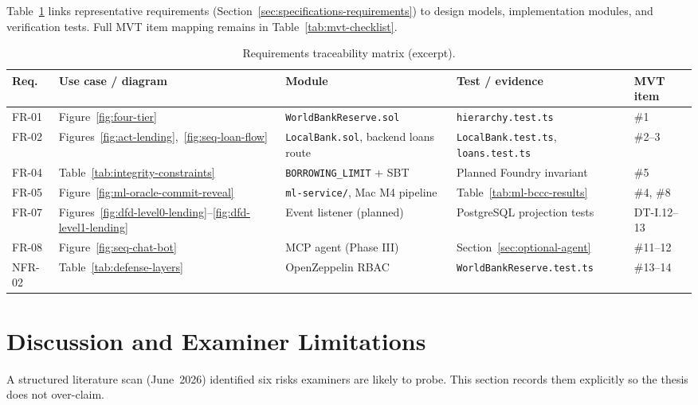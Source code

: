 \documentclass[12pt,a4paper]{report}
\newcommand{\tableheadcolor}{\rowcolor{TableHeadBg}}
\begin{document}
Table~\ref{tab:traceability} links representative requirements (Section~\ref{sec:specifications-requirements}) to design models, implementation modules, and verification tests. Full MVT item mapping remains in Table~\ref{tab:mvt-checklist}.

\begin{table}[H]
\centering
\caption[Requirements traceability matrix (excerpt)]{Requirements traceability matrix (excerpt).}
\label{tab:traceability}
\footnotesize
\begin{tabular}{@{}p{1.1cm}p{2.6cm}p{2.8cm}p{2.6cm}p{3.2cm}@{}}
\toprule
\tableheadcolor
\textbf{Req.} & \textbf{Use case / diagram} & \textbf{Module} & \textbf{Test / evidence} & \textbf{MVT item} \\
\midrule
FR-01 & Figure~\ref{fig:four-tier} & \texttt{WorldBankReserve.sol} & \texttt{hierarchy.test.ts} & \#1 \\
FR-02 & Figures~\ref{fig:act-lending},~\ref{fig:seq-loan-flow} & \texttt{LocalBank.sol}, backend loans route & \texttt{LocalBank.test.ts}, \texttt{loans.test.ts} & \#2--3 \\
FR-04 & Table~\ref{tab:integrity-constraints} & \texttt{BORROWING\_LIMIT} + SBT & Planned Foundry invariant & \#5 \\
FR-05 & Figure~\ref{fig:ml-oracle-commit-reveal} & \texttt{ml-service/}, Mac M4 pipeline & Table~\ref{tab:ml-bccc-results} & \#4, \#8 \\
FR-07 & Figures~\ref{fig:dfd-level0-lending}--\ref{fig:dfd-level1-lending} & Event listener (planned) & PostgreSQL projection tests & DT-I.12--13 \\
FR-08 & Figure~\ref{fig:seq-chat-bot} & MCP agent (Phase III) & Section~\ref{sec:optional-agent} & \#11--12 \\
NFR-02 & Table~\ref{tab:defense-layers} & OpenZeppelin RBAC & \texttt{WorldBankReserve.test.ts} & \#13--14 \\
\bottomrule
\end{tabular}
\end{table}

\section{Discussion and Examiner Limitations}
\label{sec:research-limitations}

A structured literature scan (June~2026) identified six risks examiners are likely to probe. This section records them explicitly so the thesis does not over-claim.
\end{document}
